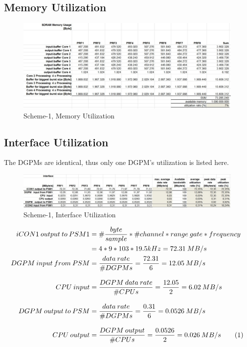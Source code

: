 \subsection{Memory Utilization}
\label{app:sch1:mem_util}
\begin{figure}[h!]
	\centering
	\includegraphics[width=160mm]{figures/aa_scheme1_mem_util}
	\caption{Scheme-1, Memory Utilization}
	\label{fig:existing_analysis:aa_scheme1_mem_util}
\end{figure}

\subsection{Interface Utilization}
\label{app:sch1:mem_util}
The DGPMs are identical, thus only one DGPM's utilization is listed here.
\begin{figure}[h!]
	\centering
	\includegraphics[width=160mm]{figures/aa_scheme1_interface_util}
	\caption{Scheme-1, Interface Utilization}
	\label{fig:existing_analysis:aa_scheme1_interface_util}
\end{figure}
\begin{align*}
	\label{equ:aa:scheme1:interface_util}
	iCON1 \: output \: to \: PSM1 &= \#\frac{byte}{sample} * \#channel * range \: gate * frequency \\
	&= 4 * 9 * 103 * 19.5kHz = 72.31 \: MB/s \\
	DGPM \: input \: from \: PSM &= \frac{data \: rate}{\#DGPMs} = \frac{72.31}{6} = 12.05 \: MB/s \\[0.3cm]
	CPU \: input &= \frac{DGPM \: data \: rate}{\#CPUs} = \frac{12.05}{2} = 6.02 \: MB/s \\[0.3cm]
	DGPM \: output \: to \: PSM &= \frac{data \: rate}{\#DGPMs} = \frac{0.31}{6} = 0.0526 \: MB/s \\[0.3cm]
	CPU \: output &= \frac{DGPM \: output}{\#CPUs} = \frac{0.0526}{2} = 0.026 \: MB/s \stepcounter{equation}\tag{\theequation}
\end{align*}

